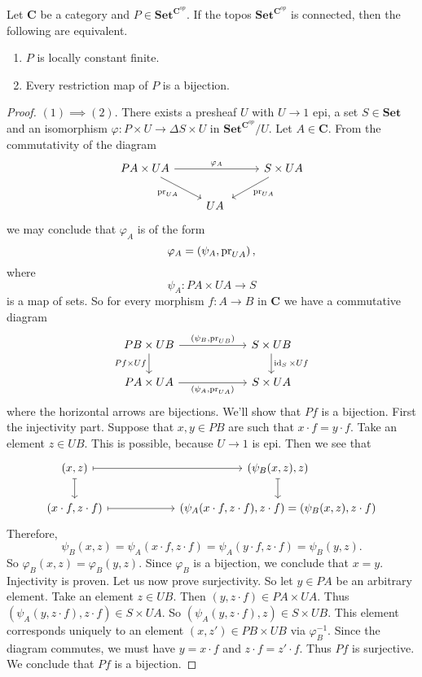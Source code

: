 \begin{proposition}
\label{prop:locally constant iff every restriction map is a bijection}
Let $\mathbf{C}$ be a category and $P \in \mathbf{Set}^{\mathbf{C}^{op}}$. If the topos $\mathbf{Set}^{\mathbf{C}^{op}}$ is connected, then the following are equivalent.
\begin{enumerate}
	\item $P$ is locally constant finite.
	\item Every restriction map of $P$ is a bijection.
\end{enumerate}
\end{proposition}
\begin{proof}
$(1) \implies (2)$. There exists a presheaf $U$ with $U \to 1$ epi, a set $S \in \mathbf{Set}$ and an isomorphism $\varphi : P \times U \to \Delta S \times U$ in $\mathbf{Set}^{\mathbf{C}^{op}}/U$. Let $A \in \mathbf{C}$. From the commutativity of the diagram
\[ \begin{tikzcd} PA \times UA \arrow[swap]{dr}{\pr_{UA}} \arrow{rr}{\varphi_A} & \; & S \times UA \arrow{dl}{\pr_{UA}} \\
\; & UA \; \end{tikzcd} \]
we may conclude that $\varphi_A$ is of the form
\[ \varphi_A = \left( \psi_A , \operatorname{pr}_{UA} \right), \]
where
\[ \psi_A : PA \times UA \to S \]
is a map of sets.
So for every morphism $f : A \to B$ in $\mathbf{C}$ we have a commutative diagram
\[ \begin{tikzcd}
PB \times UB \arrow{rr}{\left(\psi_B, \pr_{UB} \right)} \arrow[swap]{d}{Pf \times Uf} & \; & S \times UB \arrow{d}{\id_S \times Uf} \\
PA \times UA \arrow[swap]{rr}{\left(\psi_A, \pr_{UA} \right)} & \; & S \times UA
\end{tikzcd} \]
where the horizontal arrows are bijections.
We'll show that $Pf$ is a bijection. First the injectivity part. Suppose that $x,y \in PB$ are such that $x \cdot f = y \cdot f$. Take an element $z \in UB$. This is possible, because $U \to 1$ is epi. Then we see that
\[ \begin{tikzcd}
(x,z) \arrow[mapsto]{rr} \arrow[mapsto]{d} & \; & (\psi_B(x,z), z) \arrow[mapsto]{d} \\
(x \cdot f, z \cdot f) \arrow[mapsto]{rr} & \; & (\psi_A(x \cdot f, z \cdot f), z \cdot f) = (\psi_B(x,z), z \cdot f)
\end{tikzcd} \]
Therefore,
\[ \psi_B(x,z) = \psi_A(x \cdot f, z \cdot f) = \psi_A(y \cdot f, z \cdot f) = \psi_B(y,z). \]
So $\varphi_B(x,z) = \varphi_B(y,z)$. Since $\varphi_B$ is a bijection, we conclude that $x=y$. Injectivity is proven. Let us now prove surjectivity. So let $y \in PA$ be an arbitrary element.
Take an element $z \in UB$. Then $(y, z \cdot f) \in PA \times UA$. Thus $(\psi_A(y, z\cdot f), z \cdot f) \in S \times UA$. So $(\psi_A(y, z \cdot f), z) \in S \times UB$. This element corresponds uniquely to an element $(x,z') \in PB \times UB$ via $\varphi_B^{-1}$. Since the diagram commutes, we must have $y = x \cdot f$ and $z \cdot f = z' \cdot f$. Thus $Pf$ is surjective. We conclude that $Pf$ is a bijection.


\end{proof}
